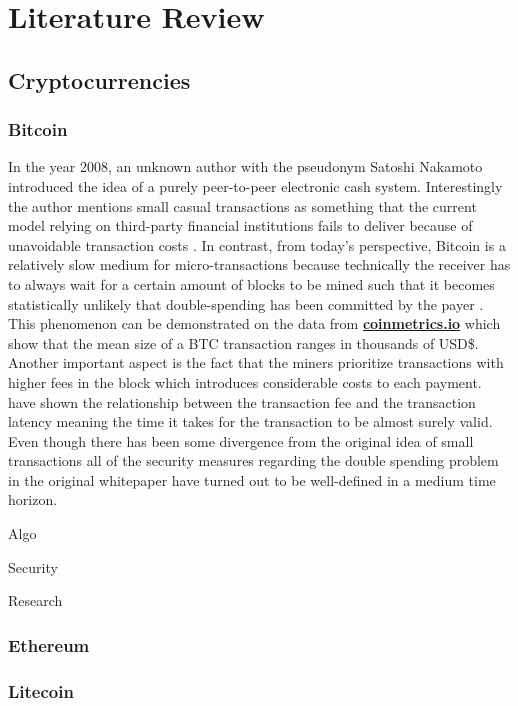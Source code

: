 \chapter{Literature Review}
\label{chap:two}


\section{Cryptocurrencies}
\label{sec:crypto}

\subsection{Bitcoin}
In the year 2008, an unknown author with the pseudonym Satoshi Nakamoto introduced the idea of 
a purely peer-to-peer electronic cash system. Interestingly the author mentions 
small casual transactions as something that the current model relying on third-party
financial institutions fails to deliver because of unavoidable transaction costs \cite{Nakamoto2008}. 
In contrast, from today's perspective, Bitcoin is a relatively slow medium for micro-transactions because 
technically the receiver has to always wait for a certain amount of blocks to be mined such that
it becomes statistically unlikely that double-spending has been committed by the payer 
\cite{Conti2018}. This phenomenon
can be demonstrated on the data from \textbf{\href{https://coinmetrics.io/}{coinmetrics.io}} which show
that the mean size of a \ac{BTC} transaction ranges in thousands of USD\$. 
Another important aspect is the fact that 
the miners prioritize transactions with higher fees in the block which introduces considerable costs
to each payment. \cite{Moeser2015} have shown the relationship between the transaction fee 
and the transaction latency meaning the time it takes for the transaction to be almost surely valid.
Even though 
there has been some divergence from the original idea of small transactions all of the security measures
regarding the double spending problem in the original whitepaper have turned out to be well-defined 
in a medium time horizon.



Algo

Security


Research


\subsection{Ethereum}

\subsection{Litecoin}


